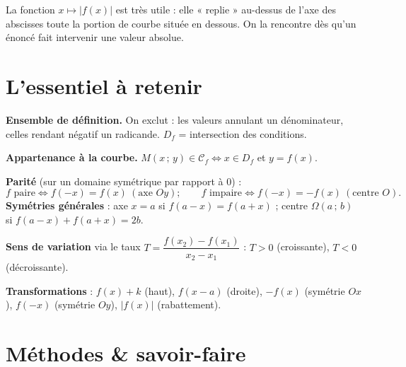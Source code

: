 \begin{illus}
\end{illus}

\begin{remarque}
La fonction $x\mapsto |f(x)|$ est très utile : elle « replie » au-dessus de l'axe des
abscisses toute la portion de courbe située en dessous. On la rencontre dès qu'un
énoncé fait intervenir une valeur absolue.
\end{remarque}

\section{L'essentiel à retenir}

\begin{synthese}
\textbf{Ensemble de définition.} On exclut : les valeurs annulant un dénominateur,
celles rendant négatif un radicande. $D_f$ = intersection des conditions.

\smallskip
\textbf{Appartenance à la courbe.} $M(x\,;\,y)\in\mathcal{C}_f \iff x\in D_f$ et $y=f(x)$.

\smallskip
\textbf{Parité} (sur un domaine symétrique par rapport à $0$) :
\[ f \text{ paire} \iff f(-x)=f(x)\ (\text{axe } Oy);\qquad
   f \text{ impaire} \iff f(-x)=-f(x)\ (\text{centre } O). \]
\textbf{Symétries générales} : axe $x=a$ si $f(a-x)=f(a+x)$ ; centre $\Omega(a\,;\,b)$
si $f(a-x)+f(a+x)=2b$.

\smallskip
\textbf{Sens de variation} via le taux $T=\dfrac{f(x_2)-f(x_1)}{x_2-x_1}$ :
$T>0$ (croissante), $T<0$ (décroissante).

\smallskip
\textbf{Transformations} : $f(x)+k$ (haut), $f(x-a)$ (droite), $-f(x)$ (symétrie $Ox$),
$f(-x)$ (symétrie $Oy$), $|f(x)|$ (rabattement).
\end{synthese}

\section{Méthodes \& savoir-faire}

